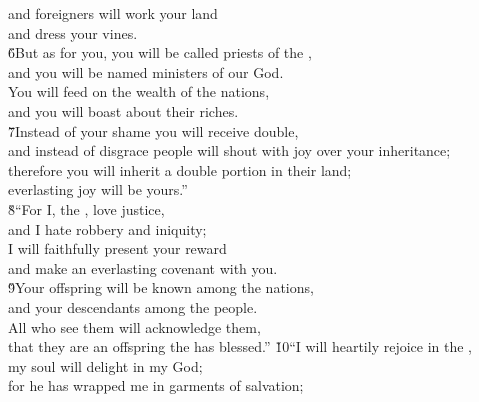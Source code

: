 \begin{poetry}
\poemll    and foreigners will work your land \\
\poemlll       and dress your vines. \\
\poeml \v{6}But as for you, you will be called priests of the , \\
\poemll    and you will be named ministers of our God. \\
\poeml You will feed on the wealth of the nations, \\
\poemll    and you will boast about their riches. \\
\poeml \v{7}Instead of your shame you will receive double, \\
\poemll    and instead of disgrace people will shout with joy over your inheritance; \\
\poeml therefore you will inherit a double portion in their land; \\
\poemll    everlasting joy will be yours.'' \\
\poeml \v{8}``For I, the , love justice, \\
\poemll    and I hate robbery and iniquity; \\
\poeml I will faithfully present your reward \\
\poemll    and make an everlasting covenant with you. \\
\poeml \v{9}Your offspring will be known among the nations, \\
\poemll    and your descendants among the people. \\
\poeml All who see them will acknowledge them, \\
\poemll    that they are an offspring the  has blessed.''
\poeml \v{10}``I will heartily rejoice in the , \\
\poemll    my soul will delight in my God; \\
\poeml for he has wrapped me in garments of salvation; \\

\end{poetry}
